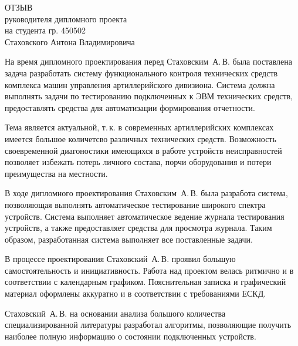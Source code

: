 
\thispagestyle{empty}


{\small
  \begin{center}
    \begin{minipage}{0.8\textwidth}
      \begin{center}
        {\normalsize ОТЗЫВ}\\
	      руководителя дипломного проекта\\
	      на студента гр. 450502\\
	      Стаховского Антона Владимировича\\
      \end{center}
    \end{minipage}
  \end{center}

На время дипломного проектирования перед Стаховским~А.\,В. была поставлена задача разработать систему
	функционального контроля технических средств комплекса машин управления артиллерийского дивизиона. Система
	должна выполнять задачи по тестированию подключенных к ЭВМ технических средств, предоставлять средства для
	автоматизации формирования отчетности.

Тема является актуальной, т.\,к. в современных артиллерийских комплексах имеется большое количетсво различных
	технических средств.
Возможность своевременной диагоностики имеющихся в работе устройств неисправностей позволяет избежать потерь личного
	состава, порчи оборудования и потери преимущества на местности.

В ходе дипломного проектирования Стаховским~А.\,В. была разработа система, позволяющая выполнять автоматическое
	тестирование широкого спектра устройств. Система выполняет автоматическое ведение журнала
	тестирования устройств, а также предоставляет средства для просмотра журнала. Таким образом, разработанная
	система выполняет все поставленные задачи.

В процессе проектирования Стаховский~А.\,В. проявил большую самостоятельность и инициативность.
Работа над проектом велась ритмично и в соответствии с календарным графиком.
Пояснительная записка и графический материал оформлены аккуратно и в соответствии с требованиями ЕСКД.

Стаховский~А.\,В. на основании анализа большого количества специализированной литературы разработал алгоритмы,
	позволяющие получить наиболее полную информацию о состоянии подключенных устройств.


}
